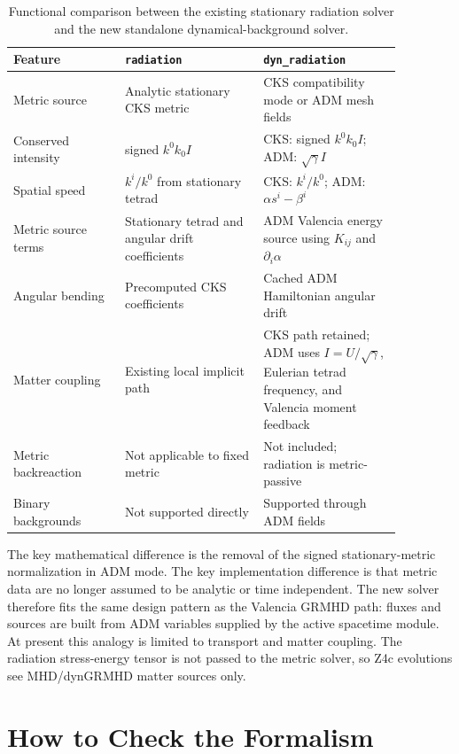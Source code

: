\documentclass[11pt]{article}
\newcommand{\code}[1]{\texttt{#1}}
\begin{document}
\begin{table}[htbp]
\centering
\small
\begin{tabular}{p{0.25\linewidth}p{0.31\linewidth}p{0.31\linewidth}}
\toprule
Feature & \code{radiation} & \code{dyn\_radiation} \\
\midrule
Metric source & Analytic stationary CKS metric & CKS compatibility mode or ADM mesh fields \\
Conserved intensity & signed \(k^0k_0I\) & CKS: signed \(k^0k_0I\); ADM: \(\sqrt{\gamma}I\) \\
Spatial speed & \(k^i/k^0\) from stationary tetrad & CKS: \(k^i/k^0\); ADM: \(\alpha s^i-\beta^i\) \\
Metric source terms & Stationary tetrad and angular drift coefficients & ADM Valencia energy source using \(K_{ij}\) and \(\partial_i\alpha\) \\
Angular bending & Precomputed CKS coefficients & Cached ADM Hamiltonian angular drift \\
Matter coupling & Existing local implicit path & CKS path retained; ADM uses \(I=U/\sqrt{\gamma}\), Eulerian tetrad frequency, and Valencia moment feedback \\
Metric backreaction & Not applicable to fixed metric & Not included; radiation is metric-passive \\
Binary backgrounds & Not supported directly & Supported through ADM fields \\
\bottomrule
\end{tabular}
\caption{Functional comparison between the existing stationary radiation solver
and the new standalone dynamical-background solver.}
\label{tab:comparison}
\end{table}

The key mathematical difference is the removal of the signed stationary-metric
normalization in ADM mode.  The key implementation difference is that metric
data are no longer assumed to be analytic or time independent.  The new solver
therefore fits the same design pattern as the Valencia GRMHD path: fluxes and
sources are built from ADM variables supplied by the active spacetime module.
At present this analogy is limited to transport and matter coupling.  The
radiation stress-energy tensor is not passed to the metric solver, so Z4c
evolutions see MHD/dynGRMHD matter sources only.

\section{How to Check the Formalism}
\label{sec:checklist}
\end{document}
